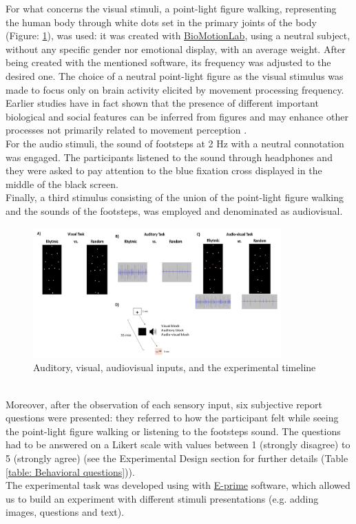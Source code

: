 For what concerns the visual stimuli, a point-light figure walking, representing the human body through white dots set in the primary joints of the body (Figure: \ref{fig: visual stimuli}), was used: it was created with \href{https://www.biomotionlab.ca/html5-bml-walker/}{BioMotionLab}, using a neutral subject, without any specific gender nor emotional display, with an average weight. After being created with the mentioned software, its frequency was adjusted to the desired one. The choice of a neutral point-light figure as the visual stimulus was made to focus only on brain activity elicited by movement processing frequency. Earlier studies have in fact shown that the presence of different important biological and social features can be inferred from figures and may enhance other processes not primarily related to movement perception \parencite{Cracco_2022}. \\
For the audio stimuli, the sound of footsteps at 2 Hz with a neutral connotation was engaged. The participants listened to the sound through headphones and they were asked to pay attention to the blue fixation cross displayed in the middle of the black screen. \\
Finally, a third stimulus consisting of the union of the point-light figure walking and the sounds of the footsteps, was employed and denominated as audiovisual. 
\begin{figure}[h]
    \centering
        \includegraphics[width=0.85\textwidth]{appendix/Picture 1.png}
        \caption{Auditory, visual, audiovisual inputs, and the experimental timeline}
        \label{fig: visual stimuli}
\end{figure} \\
Moreover, after the observation of each sensory input, six subjective report questions were presented: they referred to how the participant felt while seeing the point-light figure walking or listening to the footsteps sound. The questions had to be answered on a Likert scale with values between 1 (strongly disagree) to 5 (strongly agree) (see the Experimental Design section for further details (Table \ref{table: Behavioral questions})). \\
The experimental task was developed using with \href{https://pstnet.com/products/e-prime/}{E-prime} software, which allowed us to build an experiment with different stimuli presentations (e.g. adding images, questions and text).

